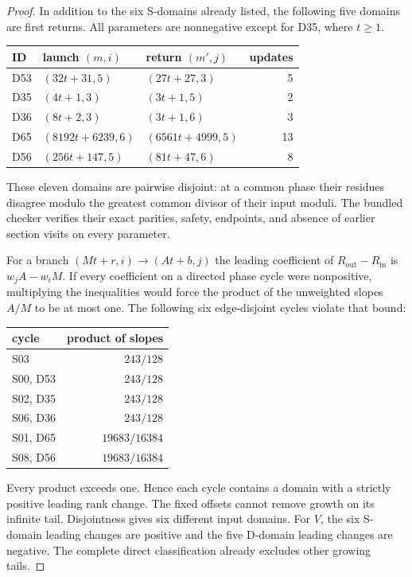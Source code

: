 \begin{proof}
In addition to the six S-domains already listed, the following five
domains are first returns.  All parameters are nonnegative except
for D35, where $t\ge1$.
\begin{center}
\begin{tabular}{lllr}
\hline
ID&launch $(m,i)$&return $(m',j)$&updates\\ \hline
D53&$(32t+31,5)$&$(27t+27,3)$&5\\
D35&$(4t+1,3)$&$(3t+1,5)$&2\\
D36&$(8t+2,3)$&$(3t+1,6)$&3\\
D65&$(8192t+6239,6)$&$(6561t+4999,5)$&13\\
D56&$(256t+147,5)$&$(81t+47,6)$&8\\ \hline
\end{tabular}
\end{center}
These eleven domains are pairwise disjoint: at a common phase their
residues disagree modulo the greatest common divisor of their input
moduli.  The bundled checker verifies their exact parities, safety,
endpoints, and absence of earlier section visits on every parameter.

For a branch $(Mt+r,i)\to(At+b,j)$ the leading coefficient of
$R_{\mathrm{out}}-R_{\mathrm{in}}$ is $w_jA-w_iM$.
If every coefficient on a directed phase cycle were nonpositive,
multiplying the inequalities would force the product of the
unweighted slopes $A/M$ to be at most one.  The following six
edge-disjoint cycles violate that bound:
\begin{center}
\begin{tabular}{lr}
\hline
cycle&product of slopes\\ \hline
S03&$243/128$\\
S00, D53&$243/128$\\
S02, D35&$243/128$\\
S06, D36&$243/128$\\
S01, D65&$19683/16384$\\
S08, D56&$19683/16384$\\ \hline
\end{tabular}
\end{center}
Every product exceeds one.  Hence each cycle contains a domain
with a strictly positive leading rank change.  The fixed offsets
cannot remove growth on its infinite tail.  Disjointness gives six
different input domains.  For $V$, the six S-domain leading changes
are positive and the five D-domain leading changes are negative.
The complete direct classification already excludes other growing
tails.
\end{proof}


